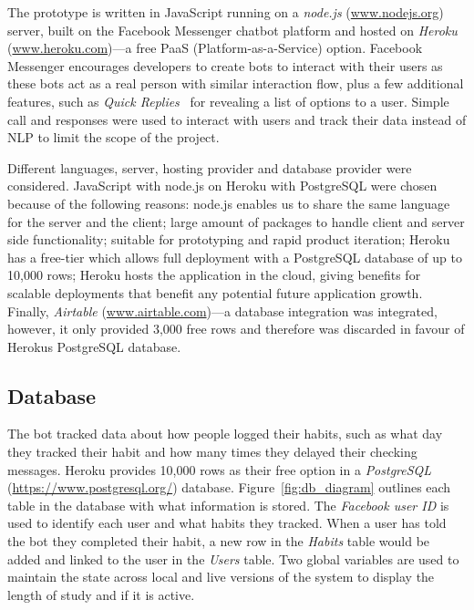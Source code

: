 The prototype is written in JavaScript running on a \textit{node.js} (\url{www.nodejs.org}) server, built on the Facebook Messenger chatbot platform and hosted on \textit{Heroku} (\url{www.heroku.com})---a free PaaS (Platform-as-a-Service) option. Facebook Messenger encourages developers to create bots to interact with their users as these bots act as a real person with similar interaction flow, plus a few additional features, such as \textit{Quick Replies}~\cite{doc_fb_quick_replies} for revealing a list of options to a user. Simple call and responses were used to interact with users and track their data instead of NLP to limit the scope of the project.


Different languages, server, hosting provider and database provider were considered. JavaScript with node.js on Heroku with PostgreSQL were chosen because of the following reasons: node.js enables us to share the same language for the server and the client; large amount of packages to handle client and server side functionality; suitable for prototyping and rapid product iteration; Heroku has a free-tier which allows full deployment with a PostgreSQL database of up to 10,000 rows; Heroku hosts the application in the cloud, giving benefits for scalable deployments that benefit any potential future application growth. Finally, \textit{Airtable} (\url{www.airtable.com})---a database integration was integrated, however, it only provided 3,000 free rows and therefore was discarded in favour of Herokus PostgreSQL database.


\subsection{Database}
The bot tracked data about how people logged their habits, such as what day they tracked their habit and how many times they delayed their checking messages. Heroku provides 10,000 rows as their free option in a \textit{PostgreSQL} (\url{https://www.postgresql.org/}) database. Figure~\ref{fig:db_diagram} outlines each table in the database with what information is stored. The \textit{Facebook user ID} is used to identify each user and what habits they tracked. When a user has told the bot they completed their habit, a new row in the \textit{Habits} table would be added and linked to the user in the \textit{Users} table. Two global variables are used to maintain the state across local and live versions of the system to display the length of study and if it is active.

